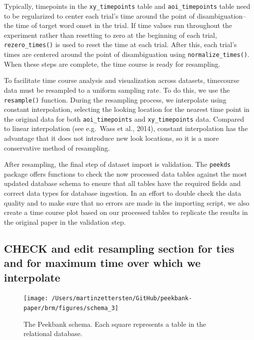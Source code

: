 \documentclass[
  english,
  man,floatsintext]{apa6}
\begin{document}
Typically, timepoints in the \texttt{xy\_timepoints} table and \texttt{aoi\_timepoints} table need to be regularized to center each trial's time around the point of disambiguation--the time of target word onset in the trial.
If time values run throughout the experiment rather than resetting to zero at the beginning of each trial, \texttt{rezero\_times()} is used to reset the time at each trial.
After this, each trial's times are centered around the point of disambiguation using \texttt{normalize\_times()}.
When these steps are complete, the time course is ready for resampling.

To facilitate time course analysis and visualization across datasets, timecourse data must be resampled to a uniform sampling rate.
To do this, we use the \texttt{resample()} function.
During the resampling process, we interpolate using constant interpolation, selecting the looking location for the nearest time point in the original data for both \texttt{aoi\_timepoints} and \texttt{xy\_timepoints} data.
Compared to linear interpolation (see e.g.~Wass et al., 2014), constant interpolation has the advantage that it does not introduce new look locations, so it is a more conservative method of resampling.

After resampling, the final step of dataset import is validation.
The \texttt{peekds} package offers functions to check the now processed data tables against the most updated database schema to ensure that all tables have the required fields and correct data types for database ingestion.
In an effort to double check the data quality and to make sure that no errors are made in the importing script, we also create a time course plot based on our processed tables to replicate the results in the original paper in the validation step.

\hypertarget{check-and-edit-resampling-section-for-ties-and-for-maximum-time-over-which-we-interpolate}{%
\subsection{CHECK and edit resampling section for ties and for maximum time over which we interpolate}\label{check-and-edit-resampling-section-for-ties-and-for-maximum-time-over-which-we-interpolate}}

\begin{figure}

{\centering \texttt{[image: /Users/martinzettersten/GitHub/peekbank-paper/brm/figures/schema\_3]} 

}

\caption{The Peekbank schema. Each square represents a table in the relational database.}\label{fig:fig-schema}
\end{figure}
\end{document}
